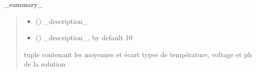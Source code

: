 \documentclass[letterpaper,10pt,french]{sphinxmanual}
\begin{document}

\begin{fulllineitems}
\label{\detokenize{library:lib_pH.indiv_measure}}
\pysigstartsignatures
\pysiglinewithargsret
{}
{\sphinxparamcomma {}\sphinxparamcomma {}}
{}
\pysigstopsignatures
\sphinxAtStartPar
\_summary\_
\begin{quote}\begin{description}
\begin{itemize}
\item {} 
\sphinxAtStartPar
{} () \textendash{} \_description\_

\item {} 
\sphinxAtStartPar
{} (\sphinxstyleliteralemphasis{\sphinxupquote{, }}) \textendash{} \_description\_, by default 10

\end{itemize}

\sphinxAtStartPar
tuple contenant les moyennes et écart types de température, voltage et ph de la solution

\end{description}\end{quote}

\end{fulllineitems}

\end{document}
